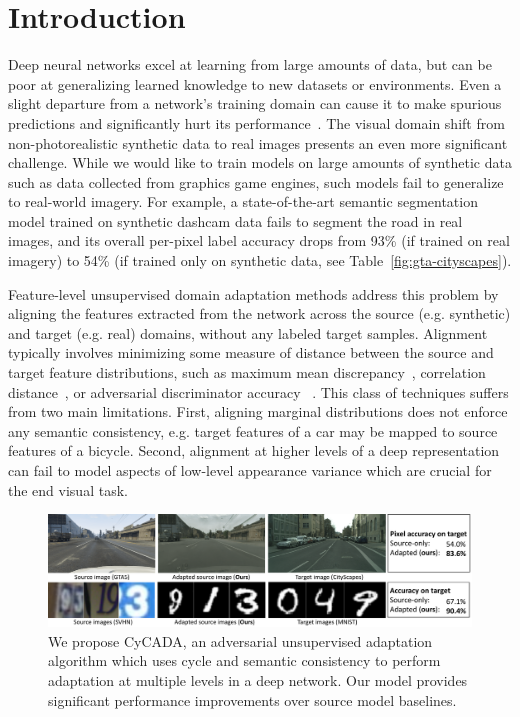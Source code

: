 \section{Introduction}

Deep neural networks excel at learning from large amounts of data, but can be poor at generalizing  learned knowledge to new datasets or environments.
Even a slight departure from a network's training domain can cause it to make spurious predictions and significantly hurt its performance~\citep{tzeng_cvpr17}.
The visual domain shift from non-photorealistic synthetic data to real images presents an even more significant challenge.
While we would like to train models on large amounts of synthetic data such as data collected from graphics game engines, such models fail to generalize to real-world imagery.
For example, a state-of-the-art semantic segmentation model trained on synthetic dashcam data fails to segment the road in real images, and its overall per-pixel label accuracy drops from 93\% (if trained on real imagery) to 54\% (if trained only on synthetic data, see Table~\ref{fig:gta-cityscapes}).


Feature-level unsupervised domain adaptation methods address this problem by aligning the features extracted from the network across the source (e.g. synthetic) and target (e.g. real) domains, without any labeled target samples.
Alignment typically involves minimizing some measure of distance between the source and target feature distributions, such as maximum mean discrepancy~\citep{long_icml15}, correlation distance~\citep{sun_taskcv16}, or adversarial discriminator accuracy ~\citep{ganin_icml15,tzeng_cvpr17}.
This class of techniques suffers from two main limitations. First, aligning marginal distributions does not enforce any semantic consistency, e.g. target features of a car may be mapped to source features of a bicycle. Second, alignment at higher levels of a deep representation can fail to model aspects of low-level appearance variance which are crucial for the end visual task. 

\begin{figure}[t]	
	\centering
	\includegraphics[width=\linewidth]{figs/cycada-fig1}
	\caption{We propose CyCADA, an adversarial unsupervised adaptation algorithm which uses cycle and semantic consistency to perform adaptation at multiple levels in a deep network. Our model provides significant performance improvements over source model baselines.}
	\label{fig:teaser}
\end{figure}

